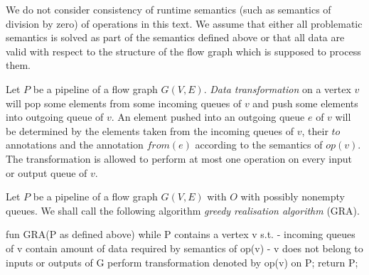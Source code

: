  We do not consider consistency of runtime semantics (such as semantics of division by zero) of operations in this text. We assume that either all problematic semantics is solved as part of the semantics defined above or that all data are valid with respect to the structure of the flow graph which is supposed to process them.


  Let $P$ be a pipeline of a flow graph $G(V,E)$. \emph{Data transformation} on a vertex $v$ will pop some elements from some incoming queues of $v$ and push some elements into outgoing queue of $v$. An element pushed into an outgoing queue $e$ of $v$ will be determined by the elements taken from the incoming queues of $v$, their $to$ annotations and the annotation $from(e)$ according to the semantics of $op(v)$. The transformation is allowed to perform at most one operation on every input or output queue of $v$.
\myenddef


  Let $P$ be a pipeline of a flow graph $G(V,E)$ with $O$ with possibly nonempty queues. We shall call the following algorithm \emph{greedy realisation algorithm} (GRA).
  \begin{code}
fun GRA(P as defined above)
{
  while P contains a vertex v s.t. 
    - incoming queues of v contain amount of data 
               required by semantics of op(v) 
    - v does not belong to inputs or outputs of G
  {
    perform transformation denoted by op(v) on P;
  }
  return P;  
}
  \end{code}
\myendalg


